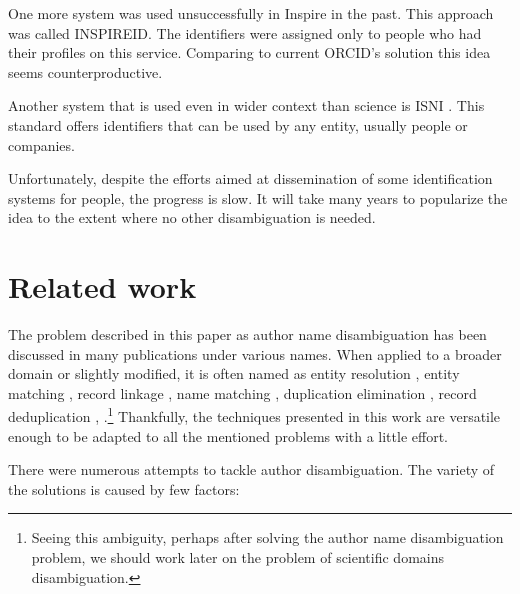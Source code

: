 \documentclass{pracamgr}
\begin{document}
One more system was used unsuccessfully in Inspire in the past. This approach was called
INSPIREID. The identifiers were assigned only to people who had their profiles on this
service. Comparing to current ORCID's solution this idea seems counterproductive.

Another system that is used even in wider context than science is ISNI \citep{isni}. This
standard offers identifiers that can be used by any entity, usually people or companies.

Unfortunately, despite the efforts aimed at dissemination of some identification systems for
people, the progress is slow. It will take many years to popularize the idea to the extent
where no other disambiguation is needed.


\chapter{Related work}\label{chap:related}

The problem described in this paper as author name disambiguation has been discussed in
many publications under various names. When applied to a broader domain or slightly modified,
it is often named as entity resolution \citep{Whang}, entity matching \citep{Kopcke}, record 
linkage \citep{Bhattacharya}, name matching \citep{Bilenko}, duplication elimination 
\citep{Ananthakrishna}, record deduplication \citep{culotta2007author},
\citep{bitton}.\footnote{Seeing this ambiguity, perhaps after solving the author name
disambiguation problem, we should work later on the problem of scientific domains
disambiguation.} Thankfully, the techniques presented in this work are versatile enough to
be adapted to all the mentioned problems with a little effort.

There were numerous attempts to tackle author disambiguation. The variety of the solutions
is caused by few factors:
\end{document}
